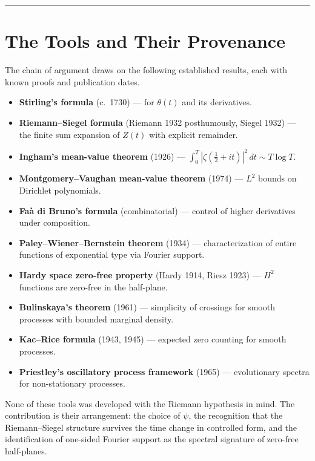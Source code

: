 \documentclass[12pt]{article}
\begin{document}
\bigskip
\hrule
\bigskip

\section{The Tools and Their Provenance}

The chain of argument draws on the following established results, each with known proofs
and publication dates.
\begin{itemize}
    \item \textbf{Stirling's formula} (c.\ 1730) --- for $\theta(t)$ and its
          derivatives.
    \item \textbf{Riemann--Siegel formula} (Riemann 1932 posthumously, Siegel 1932)
          --- the finite sum expansion of $Z(t)$ with explicit remainder.
    \item \textbf{Ingham's mean-value theorem} (1926) ---
          $\int_0^T |\zeta(\tfrac{1}{2}+it)|^2\,dt \sim T\log T$.
    \item \textbf{Montgomery--Vaughan mean-value theorem} (1974) --- $L^2$ bounds on
          Dirichlet polynomials.
    \item \textbf{Fa\`{a} di Bruno's formula} (combinatorial) --- control of higher
          derivatives under composition.
    \item \textbf{Paley--Wiener--Bernstein theorem} (1934) --- characterization of
          entire functions of exponential type via Fourier support.
    \item \textbf{Hardy space zero-free property} (Hardy 1914, Riesz 1923) --- $H^2$
          functions are zero-free in the half-plane.
    \item \textbf{Bulinskaya's theorem} (1961) --- simplicity of crossings for smooth
          processes with bounded marginal density.
    \item \textbf{Kac--Rice formula} (1943, 1945) --- expected zero counting for smooth
          processes.
    \item \textbf{Priestley's oscillatory process framework} (1965) --- evolutionary
          spectra for non-stationary processes.
\end{itemize}

None of these tools was developed with the Riemann hypothesis in mind. The contribution
is their arrangement: the choice of $\psi$, the recognition that the Riemann--Siegel
structure survives the time change in controlled form, and the identification of
one-sided Fourier support as the spectral signature of zero-free half-planes.
\end{document}
